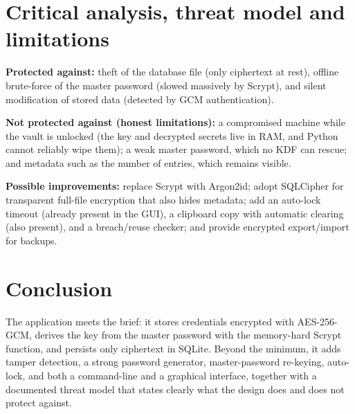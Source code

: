 \documentclass[11pt,a4paper]{article}
\begin{document}
\section{Critical analysis, threat model and limitations}
\textbf{Protected against:} theft of the database file (only ciphertext at
rest), offline brute-force of the master password (slowed massively by Scrypt),
and silent modification of stored data (detected by GCM authentication).

\textbf{Not protected against (honest limitations):} a compromised machine while
the vault is unlocked (the key and decrypted secrets live in RAM, and Python
cannot reliably wipe them); a weak master password, which no KDF can rescue; and
metadata such as the number of entries, which remains visible.

\textbf{Possible improvements:} replace Scrypt with Argon2id; adopt SQLCipher for
transparent full-file encryption that also hides metadata; add an auto-lock
timeout (already present in the GUI), a clipboard copy with automatic clearing
(also present), and a breach/reuse checker; and provide encrypted export/import
for backups.

\section{Conclusion}
The application meets the brief: it stores credentials encrypted with AES-256-GCM,
derives the key from the master password with the memory-hard Scrypt function,
and persists only ciphertext in SQLite. Beyond the minimum, it adds tamper
detection, a strong password generator, master-password re-keying, auto-lock,
and both a command-line and a graphical interface, together with a documented
threat model that states clearly what the design does and does not protect
against.
\end{document}
